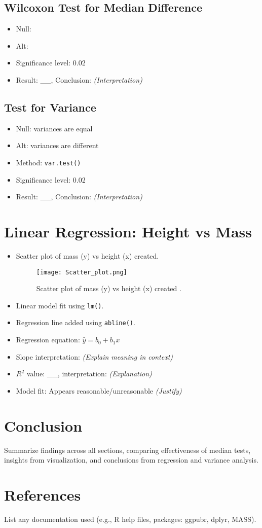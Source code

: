 \documentclass{article}
\begin{document}
\subsection{Wilcoxon Test for Median Difference}
\begin{itemize}
    \item Null: 
    \item Alt:
    \item Significance level: 0.02
    \item Result: \_\_, Conclusion: \textit{(Interpretation)}
\end{itemize}

\subsection{Test for Variance}
\begin{itemize}
    \item Null: variances are equal
    \item Alt: variances are different
    \item Method: \texttt{var.test()}
    \item Significance level: 0.02
    \item Result: \_\_, Conclusion: \textit{(Interpretation)}
\end{itemize}

\section{Linear Regression: Height vs Mass}
\begin{itemize}
    \item Scatter plot of mass (y) vs height (x) created.
    \begin{figure}[H]
    \centering
    \texttt{[image: Scatter\_plot.png]} %
    \caption{Scatter plot of mass (y) vs height (x) created .}
    \label{fig:Scatter_plot}
\end{figure}
    \item Linear model fit using \texttt{lm()}.
    \item Regression line added using \texttt{abline()}.
    \item Regression equation: \(\hat{y} = b_0 + b_1x\)
    \item Slope interpretation: \textit{(Explain meaning in context)}
    \item \(R^2\) value: \_\_, interpretation: \textit{(Explanation)}
    \item Model fit: Appears reasonable/unreasonable \textit{(Justify)}
\end{itemize}

\section{Conclusion}
Summarize findings across all sections, comparing effectiveness of median tests, insights from visualization, and conclusions from regression and variance analysis.

\section{References}
List any documentation used (e.g., R help files, packages: ggpubr, dplyr, MASS).
\end{document}
